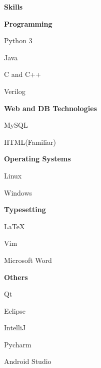 \documentclass[a4paper,12pt,final]{memoir}
\newcommand{\Sep}{\vspace{1.5em}}
\newcommand{\SmallSep}{\vspace{0.5em}}
\newcommand{\CVSection}[1]
	{\Large\textbf{#1}\par
	\SmallSep\normalsize\normalfont}
\newcommand{\CVItem}[1]
	{\textbf{\color{RoyalBlue} #1}}
\begin{document}
\CVSection{Skills}
\CVItem{Programming}
\begin{multicols}{3}
\begin{compactitem}[\color{RoyalBlue}$\circ$]
	\item Python 3
	\item Java
	\item C and C++
	\item Verilog
	
\end{compactitem}
\end{multicols}
\SmallSep
\CVItem{Web and DB Technologies}
\begin{multicols}{3}
\begin{compactitem}[\color{RoyalBlue}$\circ$]
	\item MySQL 
	\item HTML(Familiar)
\end{compactitem}
\end{multicols}
\SmallSep
\CVItem{Operating Systems}
\begin{multicols}{3}
\begin{compactitem}[\color{RoyalBlue}$\circ$]
	\item Linux
	\item Windows
\end{compactitem}
\end{multicols}
\SmallSep
\CVItem{Typesetting}
\begin{multicols}{3}
\begin{compactitem}[\color{RoyalBlue}$\circ$]
	\item \LaTeX
	\item Vim
	\item Microsoft Word
\end{compactitem}
\end{multicols}
\SmallSep
\CVItem{Others}
\begin{multicols}{3}
\begin{compactitem}[\color{RoyalBlue}$\circ$]
	\item Qt
	\item Eclipse
	\item IntelliJ
	\item Pycharm
	\item Android Studio
\end{compactitem}
\end{multicols}

\Sep 
\end{document}
